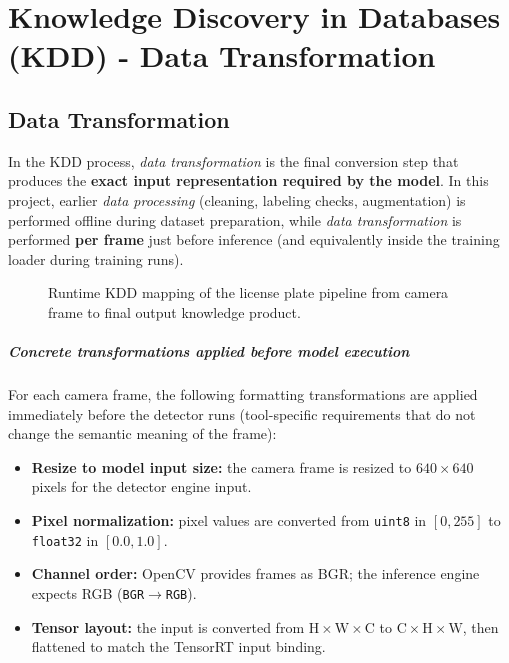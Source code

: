 %
%
%


\usetikzlibrary{arrows.meta, positioning}

\chapter{Knowledge Discovery in Databases (KDD) - Data Transformation}
\label{ch:kdd_data_transformation}

\section{Data Transformation}
\label{subsec:kdd_data_transformation}

In the KDD process, \textit{data transformation} is the final conversion step that produces the \textbf{exact input representation required by the model}. In this project, earlier \textit{data processing} (cleaning, labeling checks, augmentation) is performed offline during dataset preparation, while \textit{data transformation} is performed \textbf{per frame} just before inference (and equivalently inside the training loader during training runs).

\begin{figure}[htbp]
	\centering
	
	\caption{Runtime KDD mapping of the license plate pipeline from camera frame to final output knowledge product.}
	\label{fig:kdd_runtime_pipeline}
\end{figure}

\paragraph{Concrete transformations applied before model execution}
For each camera frame, the following formatting transformations are applied immediately before the detector runs (tool-specific requirements that do not change the semantic meaning of the frame):
\begin{itemize}
	\item \textbf{Resize to model input size:} the camera frame is resized to \(640\times640\) pixels for the detector engine input.
	\item \textbf{Pixel normalization:} pixel values are converted from \texttt{uint8} in \([0,255]\) to \texttt{float32} in \([0.0,1.0]\).
	\item \textbf{Channel order:} OpenCV provides frames as BGR; the inference engine expects RGB (\texttt{BGR\(\rightarrow\)RGB}).
	\item \textbf{Tensor layout:} the input is converted from \(\text{H}\times\text{W}\times\text{C}\) to \(\text{C}\times\text{H}\times\text{W}\), then flattened to match the TensorRT input binding.
\end{itemize}

